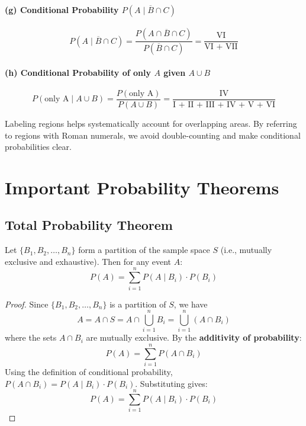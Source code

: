 \begin{eg}
\paragraph{(g) Conditional Probability $P(A \mid \overline{B} \cap C)$}
\[
P(A \mid \overline{B} \cap C) = \frac{P(A \cap \overline{B} \cap C)}{P(\overline{B} \cap C)} = \frac{\text{VI}}{\text{VI + VII}}
\]

\paragraph{(h) Conditional Probability of only $A$ given $A \cup B$}
\[
P(\text{only A} \mid A \cup B) = \frac{P(\text{only A})}{P(A \cup B)} = \frac{\text{IV}}{\text{I + II + III + IV + V + VI}}
\]

\begin{intuition}
Labeling regions helps systematically account for overlapping areas. By referring to regions with Roman numerals, we avoid double-counting and make conditional probabilities clear.
\end{intuition}

\end{eg}

\section{Important Probability Theorems}

\subsection{Total Probability Theorem}

\begin{theorem}
Let $\{B_1, B_2, \ldots, B_n\}$ form a partition of the sample space $S$ (i.e., mutually exclusive and exhaustive). Then for any event $A$:
\[
P(A) = \sum_{i=1}^{n} P(A \mid B_i) \cdot P(B_i)
\]
\end{theorem}

\begin{proof}
Since $\{B_1, B_2, \ldots, B_n\}$ is a partition of $S$, we have
\[
A = A \cap S = A \cap \bigcup_{i=1}^{n} B_i = \bigcup_{i=1}^{n} (A \cap B_i)
\]
where the sets $A \cap B_i$ are mutually exclusive. By the \textbf{additivity of probability}:
\[
P(A) = \sum_{i=1}^{n} P(A \cap B_i)
\]
Using the definition of conditional probability, $P(A \cap B_i) = P(A \mid B_i) \cdot P(B_i)$. Substituting gives:
\[
P(A) = \sum_{i=1}^{n} P(A \mid B_i) \cdot P(B_i)
\]
\end{proof}

